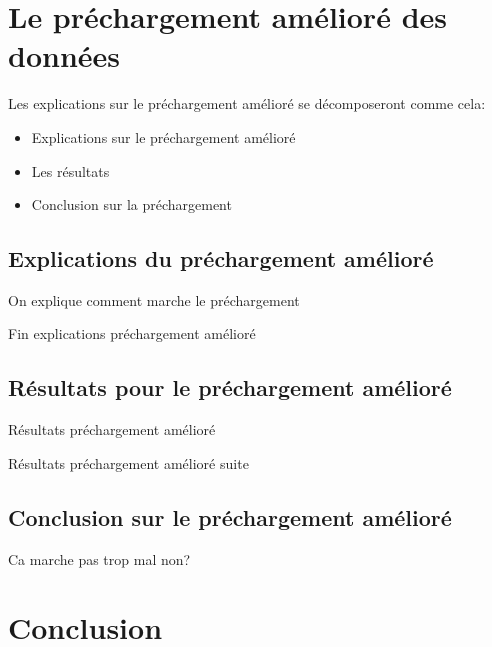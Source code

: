 \documentclass{beamer}
\begin{document}
  \section{Le préchargement amélioré des données}
  \begin{frame}
	Les explications sur le préchargement amélioré se décomposeront comme cela:
	\begin{itemize}
		\item Explications sur le préchargement amélioré
		\item Les résultats 
		\item Conclusion sur la préchargement
	\end{itemize}
  \end{frame}

  \subsection{Explications du préchargement amélioré}
  \begin{frame}
	On explique comment marche le préchargement
  \end{frame}

  \begin{frame}
	Fin explications préchargement amélioré
  \end{frame}
	
  \subsection{Résultats pour le préchargement amélioré}
  \begin{frame}
	Résultats préchargement amélioré
  \end{frame}
	
  \begin{frame}
	Résultats préchargement amélioré suite
  \end{frame}

  \subsection{Conclusion sur le préchargement amélioré}
  \begin{frame}
	Ca marche pas trop mal non?
  \end{frame}
	
  
  \section{Conclusion}
  \begin{frame}
  \end{frame}
  
  
\end{document}
